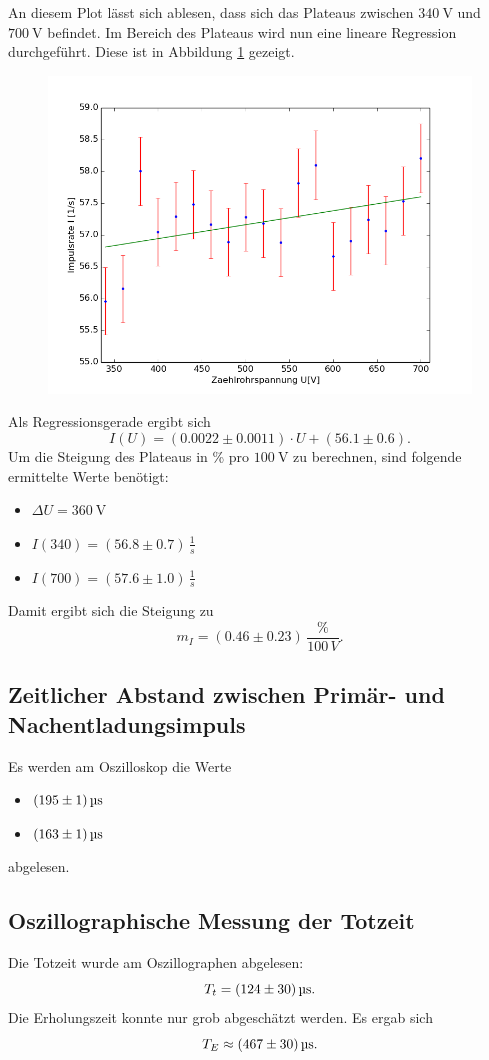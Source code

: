 \documentclass[11pt,ngerman,a4paper]{article}
\begin{document}
\noindent
An diesem Plot lässt sich ablesen, dass sich das Plateaus zwischen $\SI{340}{\volt}$ und $\SI{700}{\volt}$ befindet. Im Bereich des Plateaus wird nun eine lineare Regression durchgeführt. Diese ist in Abbildung \ref{plot2} gezeigt.
\begin{figure}[H]
\centering
\includegraphics[scale=0.8]{plot2.png}
\label{plot2}
\end{figure}
Als Regressionsgerade ergibt sich
\[
I(U) = (0.0022\pm0.0011) \cdot U + (56.1\pm0.6).
\]
Um die Steigung des Plateaus in \% pro $\SI{100}{\volt}$ zu berechnen, sind folgende ermittelte Werte benötigt:
\begin{itemize}
\item $\Delta U = \SI{360}{\volt}$
\item $I(340) = (56.8\pm0.7) \, \frac{1}{s}$
\item $I(700) = (57.6\pm1.0) \, \frac{1}{s}$
\end{itemize}
Damit ergibt sich die Steigung zu
\[
m_I = (0.46\pm0.23) \, \frac{\%}{100\, V}.
\]
\subsection{Zeitlicher Abstand zwischen Primär- und Nachentladungsimpuls}
Es werden am Oszilloskop die Werte
\begin{itemize}
\item $\SI{195+-1}{\micro\second}$
\item $\SI{163+-1}{\micro\second}$
\end{itemize}
abgelesen.
\subsection{Oszillographische Messung der Totzeit}
Die Totzeit wurde am Oszillographen abgelesen:
\[
T_{t} = \SI{124+-30}{\micro\second}.
\]
Die Erholungszeit konnte nur grob abgeschätzt werden. Es ergab sich
\[
T_E \approx \SI{467+-30}{\micro\second}.
\]
\end{document}
